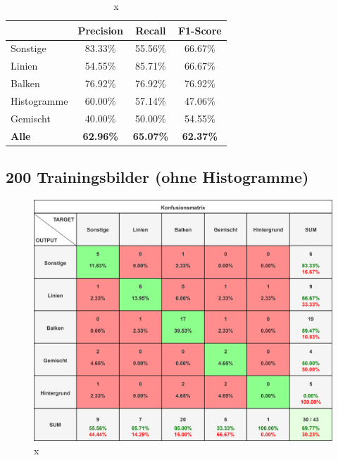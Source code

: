 \begin{table}[H]
    \centering
    \begin{tabular}{|l|c|c|c|}
        \hline
        \rowcolor[HTML]{EFEFEF}
                      & Precision        & Recall           & F1-Score         \\ \hline
        Sonstige      & 83.33\%          & 55.56\%          & 66.67\%          \\ \hline
        Linien        & 54.55\%          & 85.71\%          & 66.67\%          \\ \hline
        Balken        & 76.92\%          & 76.92\%          & 76.92\%          \\ \hline
        Histogramme   & 60.00\%          & 57.14\%          & 47.06\%          \\ \hline
        Gemischt      & 40.00\%          & 50.00\%          & 54.55\%          \\ \hline
        \textbf{Alle} & \textbf{62.96\%} & \textbf{65.07\%} & \textbf{62.37\%} \\ \hline
    \end{tabular}
    \caption{x}
\end{table}


\subsection*{200 Trainingsbilder (ohne Histogramme)}

\begin{figure}[H]
    \centering
    \captionsetup{width=1\linewidth}
    \includegraphics[width=1\textwidth]{Experimente/img/detect/2_val@0.511_200_nohisto/konfusionsmatrix.png}
    \caption{ x}
    \label{fig:extraction_output}
\end{figure}

